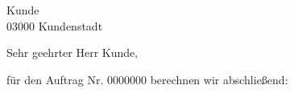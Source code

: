 \documentclass[backaddress=false,11pt,a4paper]{scrlttr2}
\begin{document}
\begin{letter}{Kunde\\
03000 Kundenstadt}
\opening{Sehr geehrter Herr Kunde,}

für den Auftrag Nr. 0000000 berechnen wir abschließend:

\vspace{10pt}

\Euro{}
\Waehrung{\euro}

\begin{Rechnung}[N]
\end{Rechnung}
\end{letter}
\end{document}
